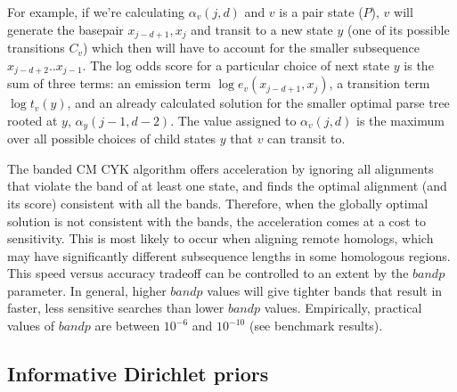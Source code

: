 \documentclass[11pt]{article}
\begin{document}
For example, if we're calculating $\alpha_v(j,d)$ and 
$v$ is a pair state ($P$), $v$ will generate the basepair $x_{j-d+1},x_j$ and
transit to a new state $y$ (one of its possible transitions $C_v$)
which then will have to account for the smaller subsequence
$x_{j-d+2}..x_{j-1}$. The log odds score for a particular choice of
next state $y$ is the sum of three terms: an emission term $\log
e_v(x_{j-d+1},x_j)$, a transition term $\log t_v(y)$, and an already
calculated solution for the smaller optimal parse tree rooted at $y$,
$\alpha_y(j-1,d-2)$. The value assigned to $\alpha_v(j, d)$
is the maximum over all possible choices of child states $y$ that $v$
can transit to. 


The banded CM CYK algorithm offers acceleration by ignoring all
alignments that violate the band of at least one state, and finds
the optimal alignment (and its score) consistent with all the
bands. 
Therefore, when
the globally optimal solution is not consistent with the bands, the
acceleration comes at a cost to sensitivity. This is most likely to
occur when aligning remote homologs, which may have significantly
different subsequence lengths in some homologous regions. This 
speed versus
accuracy tradeoff can be controlled to an extent by the $bandp$
parameter. In general, higher $bandp$ values will give tighter bands
that result in faster, less sensitive searches than lower $bandp$ values.
Empirically, practical values of $bandp$ are between $10^{-6}$ and
$10^{-10}$ (see benchmark results). 

\subsection{Informative Dirichlet priors}
\end{document}
